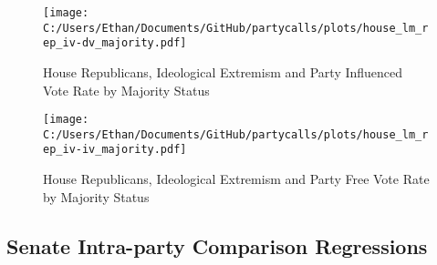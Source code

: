 \documentclass[12pt]{article}
\begin{document}
\begin{figure}[h]
	\centering
	\caption{House Republicans, Ideological Extremism and Party Influenced Vote Rate by Majority Status}
	\texttt{[image: C:/Users/Ethan/Documents/GitHub/partycalls/plots/house\_lm\_rep\_iv-dv\_majority.pdf]}
\end{figure}


\begin{figure}[h]
	\centering
	\caption{House Republicans, Ideological Extremism and Party Free Vote Rate by Majority Status}
	\texttt{[image: C:/Users/Ethan/Documents/GitHub/partycalls/plots/house\_lm\_rep\_iv-iv\_majority.pdf]}
\end{figure}

\clearpage

\subsection{Senate Intra-party Comparison Regressions}
\end{document}
